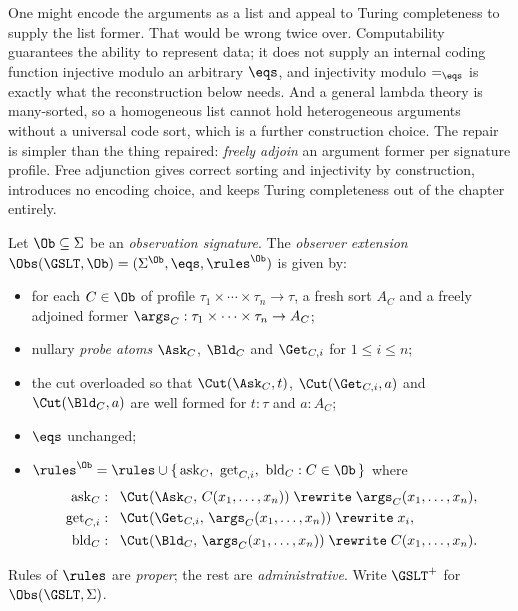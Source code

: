 \begin{remark}
\label{ox:rem:noturing}
One might encode the arguments as a list and appeal to Turing completeness to
supply the list former. That would be wrong twice over. Computability guarantees
the ability to represent data; it does not supply an internal coding function
injective modulo an arbitrary $\eqs$, and injectivity modulo $=_{\eqs}$ is exactly
what the reconstruction below needs. And a general lambda theory is many-sorted,
so a homogeneous list cannot hold heterogeneous arguments without a universal code
sort, which is a further construction choice. The repair is simpler than the thing
repaired: \emph{freely adjoin} an argument former per signature profile. Free
adjunction gives correct sorting and injectivity by construction, introduces no
encoding choice, and keeps Turing completeness out of the chapter entirely.
\end{remark}

\begin{definition}
\label{ox:def:ext}
Let $\Ob \subseteq \Sigma$ be an \emph{observation signature}. The \emph{observer
extension} $\Obs(\GSLT,\Ob) = (\Sigma^{\Ob}, \eqs, \rules^{\Ob})$ is given by:
\begin{itemize}
\item for each $C \in \Ob$ of profile
  $\tau_1 \times \cdots \times \tau_n \to \tau$, a fresh sort $A_C$ and a freely
  adjoined former $\args_C : \tau_1 \times \cdots \times \tau_n \to A_C$;
\item nullary \emph{probe atoms} $\Ask_C$, $\Bld_C$ and $\Get_{C,i}$ for
  $1 \le i \le n$;
\item the cut overloaded so that $\Cut(\Ask_C, t)$, $\Cut(\Get_{C,i}, a)$ and
  $\Cut(\Bld_C, a)$ are well formed for $t : \tau$ and $a : A_C$;
\item $\eqs$ unchanged;
\item $\rules^{\Ob} = \rules \cup \{\,\mathrm{ask}_C,\ \mathrm{get}_{C,i},\
  \mathrm{bld}_C : C \in \Ob\,\}$ where
\begin{align*}
  \mathrm{ask}_C &: \;\;
    \Cut(\Ask_C,\, C(x_1,\dots,x_n)) \;\rewrite\; \args_C(x_1,\dots,x_n),\\
  \mathrm{get}_{C,i} &: \;\;
    \Cut(\Get_{C,i},\, \args_C(x_1,\dots,x_n)) \;\rewrite\; x_i,\\
  \mathrm{bld}_C &: \;\;
    \Cut(\Bld_C,\, \args_C(x_1,\dots,x_n)) \;\rewrite\; C(x_1,\dots,x_n).
\end{align*}
\end{itemize}
Rules of $\rules$ are \emph{proper}; the rest are \emph{administrative}. Write
$\GSLT^{+}$ for $\Obs(\GSLT,\Sigma)$.
\end{definition}

